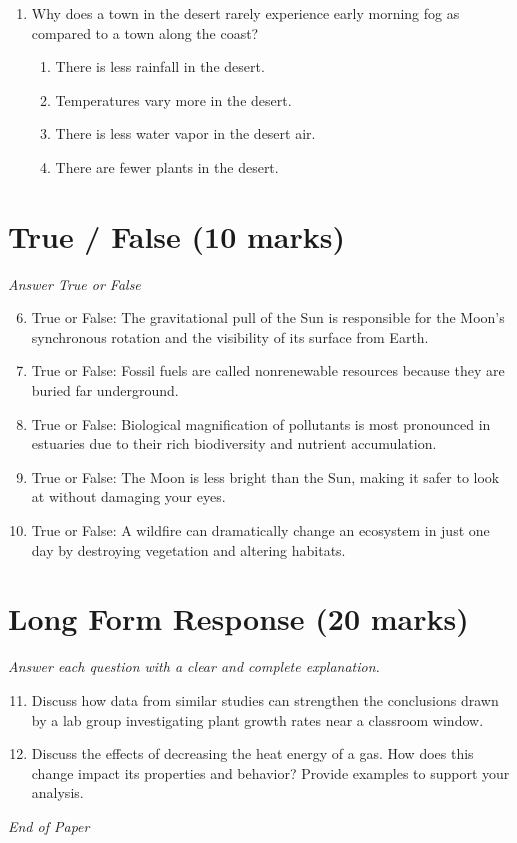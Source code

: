 \documentclass[12pt]{article}
\begin{document}
\begin{enumerate}[label=\arabic*.]
\begin{enumerate}[label=(\alph*)]
    \item an increase in precipitation
    \item a decrease in pollutants
\end{enumerate}
\item Why does a town in the desert rarely experience early morning fog as compared to a town along the coast?
\begin{enumerate}[label=(\alph*)]
    \item There is less rainfall in the desert.
    \item Temperatures vary more in the desert.
    \item There is less water vapor in the desert air.
    \item There are fewer plants in the desert.
\end{enumerate}
\end{enumerate}

\section*{True / False (10 marks)}
\textit{Answer True or False}
\begin{enumerate}[label=\arabic*.]
\setcounter{enumi}{5}
\item True or False: The gravitational pull of the Sun is responsible for the Moon's synchronous rotation and the visibility of its surface from Earth.
\item True or False: Fossil fuels are called nonrenewable resources because they are buried far underground.
\item True or False: Biological magnification of pollutants is most pronounced in estuaries due to their rich biodiversity and nutrient accumulation.
\item True or False: The Moon is less bright than the Sun, making it safer to look at without damaging your eyes.
\item True or False: A wildfire can dramatically change an ecosystem in just one day by destroying vegetation and altering habitats.
\end{enumerate}

\section*{Long Form Response (20 marks)}
\textit{Answer each question with a clear and complete explanation.}
\begin{enumerate}[label=\arabic*.]
\setcounter{enumi}{10}
\item Discuss how data from similar studies can strengthen the conclusions drawn by a lab group investigating plant growth rates near a classroom window.
\item Discuss the effects of decreasing the heat energy of a gas. How does this change impact its properties and behavior? Provide examples to support your analysis.
\end{enumerate}

\vfill
\noindent\textit{End of Paper}
\end{document}
